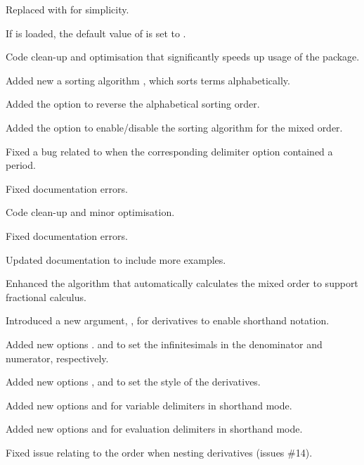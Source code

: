 \begin{changelog}
\begin{change}[version=1.1, date=2021-06-03, beta=false]
		\item Replaced  with  for simplicity.
		\item If  is loaded, the default value of  is set to .
	\end{change}
	\begin{change}[version=1.2, date=2022-07-09, beta=false]
		\item Code clean-up and optimisation that significantly speeds up usage of the package.
		\item Added new a sorting algorithm , which sorts terms alphabetically.
		\item Added the option  to reverse the alphabetical sorting order.
		\item Added the option  to enable/disable the sorting algorithm for the mixed order.
		\item Fixed a bug related to  when the corresponding delimiter option contained a period.
		\item Fixed documentation errors.
	\end{change}
	\begin{change}[version=1.3, date=2023-07-26, beta=false]
		\item Code clean-up and minor optimisation.
		\item Fixed documentation errors.
		\item Updated documentation to include more examples.
		\item Enhanced the algorithm that automatically calculates the mixed order to support fractional calculus.
		\item Introduced a new argument, \targ{!}, for derivatives to enable shorthand notation.
		\item Added new options .
		and  to set the infinitesimals in the denominator and numerator, respectively.
		\item Added new options ,  and  to set the style of the derivatives.
		\item Added new options  and  for variable delimiters in shorthand mode.
		\item Added new options  and  for evaluation delimiters in shorthand mode.
	\end{change}
	\begin{change}[version=1.31, date=2023-11-04, beta=false]
		\item Fixed issue relating to the order when nesting derivatives (issues \#14).
	\end{change}
\end{changelog}

	
